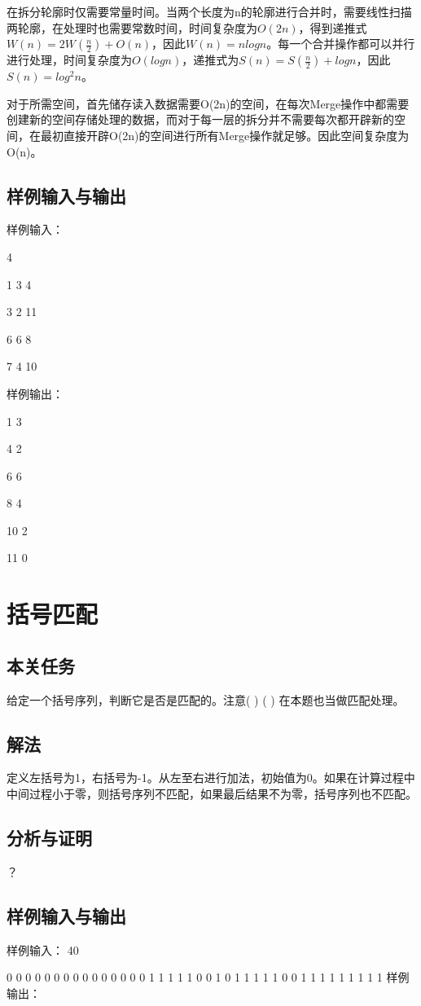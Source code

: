 \documentclass[UTF8,a4paperdui, %
]{ctexart}
\begin{document}
在拆分轮廓时仅需要常量时间。当两个长度为n的轮廓进行合并时，需要线性扫描两轮廓，在处理时也需要常数时间，时间复杂度为$O(2n)$，得到递推式$W(n)=2W(\frac{n}{2})+O(n)$，因此$W(n)=nlogn$。每一个合并操作都可以并行进行处理，时间复杂度为$O(logn)$，递推式为$S(n)=S(\frac{n}{2})+logn$，因此$S(n)=log^2n$。

对于所需空间，首先储存读入数据需要O(2n)的空间，在每次Merge操作中都需要创建新的空间存储处理的数据，而对于每一层的拆分并不需要每次都开辟新的空间，在最初直接开辟O(2n)的空间进行所有Merge操作就足够。因此空间复杂度为O(n)。

\subsection{样例输入与输出}
样例输入：

4

1 3 4

3 2 11

6 6 8

7 4 10

样例输出：

1 3 

4 2 

6 6 

8 4 

10 2 

11 0 
\section{括号匹配}
\subsection{本关任务}
给定一个括号序列，判断它是否是匹配的。注意( ) ( ) 在本题也当做匹配处理。
\subsection{解法}
定义左括号为1，右括号为-1。从左至右进行加法，初始值为0。如果在计算过程中中间过程小于零，则括号序列不匹配，如果最后结果不为零，括号序列也不匹配。

\subsection{分析与证明}
？
\subsection{样例输入与输出}
样例输入：
40 

0 0 0 0 0 0 0 0 0 0 0 0 0 0 0 1 1 1 1 1 0 0 1 0 1 1 1 1 1 0 0 1 1 1 1 1 1 1 1 1
样例输出：
\end{document}

